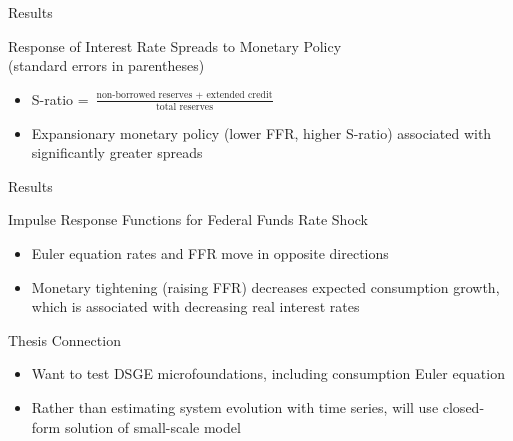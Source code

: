\documentclass{beamer}
\begin{document}
\begin{frame}{Results}
\begin{center}
Response of Interest Rate Spreads to Monetary Policy \\
(standard errors in parentheses)
\end{center}
\begin{itemize}
\item S-ratio = $\frac{\text{non-borrowed reserves } + \text{ extended credit}}{\text{total reserves}}$
\item Expansionary monetary policy (lower FFR, higher S-ratio) associated with significantly greater spreads
\end{itemize}
\end{frame}


\begin{frame}{Results}
\begin{center}
Impulse Response Functions for Federal Funds Rate Shock \\
\end{center}
\begin{itemize}
\item Euler equation rates and FFR move in opposite directions
\item Monetary tightening (raising FFR) decreases expected consumption growth, which is associated with decreasing real interest rates
\end{itemize}
\end{frame}

\begin{frame}{Thesis Connection}
\begin{itemize}
\item Want to test DSGE microfoundations, including consumption Euler equation
\item Rather than estimating system evolution with time series, will use closed-form solution of small-scale model
\end{itemize}
\end{frame}
\end{document}
